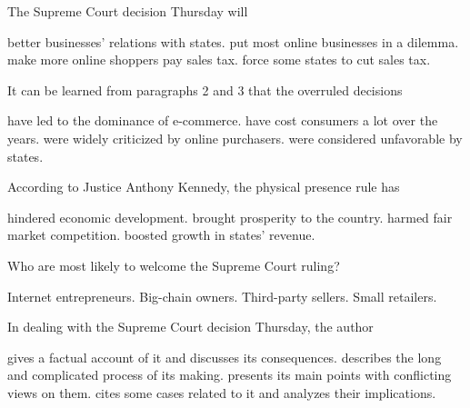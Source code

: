 \item The Supreme Court decision Thursday will
\begin{tasks}
	\task better businesses' relations with states.
	\task put most online businesses in a dilemma.
	\task make more online shoppers pay sales tax.
	\task force some states to cut sales tax.
\end{tasks}
\item It can be learned from paragraphs 2 and 3 that the overruled decisions
\begin{tasks}
	\task have led to the dominance of e-commerce.
	\task have cost consumers a lot over the years.
	\task were widely criticized by online purchasers.
	\task were considered unfavorable by states.
\end{tasks}
\item According to Justice Anthony Kennedy, the physical presence rule has
\begin{tasks}
	\task hindered economic development.
	\task brought prosperity to the country.
	\task harmed fair market competition.
	\task boosted growth in states' revenue.
\end{tasks}
\item Who are most likely to welcome the Supreme Court ruling?
\begin{tasks}
	\task Internet entrepreneurs.
	\task Big-chain owners.
	\task Third-party sellers.
	\task Small retailers.
\end{tasks}
\item In dealing with the Supreme Court decision Thursday, the author
\begin{tasks}
	\task gives a factual account of it and discusses its consequences.
	\task describes the long and complicated process of its making.
	\task presents its main points with conflicting views on them.
	\task cites some cases related to it and analyzes their implications.
\end{tasks}